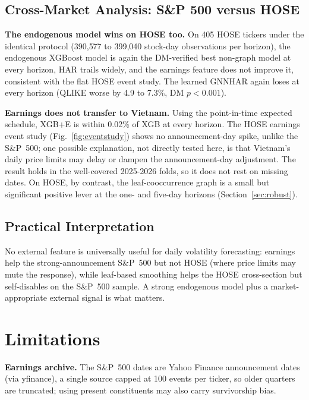 \documentclass[runningheads,a4paper]{llncs}
\begin{document}
\subsection{Cross-Market Analysis: S\&P 500 versus HOSE}\label{sec:hose}
\textbf{The endogenous model wins on HOSE too.} On 405 HOSE tickers under the identical protocol
(390{,}577 to 399{,}040 stock-day observations per horizon), the endogenous XGBoost model is again the
DM-verified best non-graph model at every horizon, HAR trails widely, and the earnings feature does not
improve it, consistent with the flat HOSE event study. The learned GNNHAR again loses at
every horizon (QLIKE worse by 4.9 to 7.3\%, DM $p<0.001$).

\textbf{Earnings does not transfer to Vietnam.} Using the point-in-time expected schedule, XGB+E is within
0.02\% of XGB at every horizon. The HOSE earnings event study (Fig.~\ref{fig:eventstudy}) shows no
announcement-day spike, unlike the S\&P~500; one possible explanation, not directly tested here, is that
Vietnam's daily price limits may delay or dampen the announcement-day adjustment. The result holds in the
well-covered 2025-2026 folds, so it does not rest on missing dates. On HOSE, by contrast, the leaf-cooccurrence graph is a small
but significant positive lever at the one- and five-day horizons (Section~\ref{sec:robust}).

\subsection{Practical Interpretation}
No external feature is universally useful for daily volatility forecasting: earnings help the
strong-announcement S\&P~500 but not HOSE (where price limits may mute the response), while
leaf-based smoothing helps the HOSE cross-section but self-disables on the S\&P~500 sample. A strong
endogenous model plus a market-appropriate external signal is what matters.

\FloatBarrier
\section{Limitations}
\noindent\textbf{Earnings archive.} The S\&P~500 dates are Yahoo Finance announcement dates (via
yfinance), a single source capped at 100 events per ticker, so older quarters are truncated; using present
constituents may also carry survivorship bias.
\end{document}
